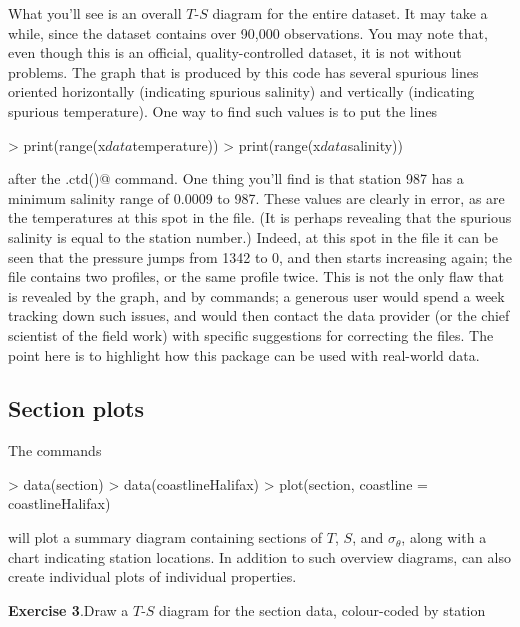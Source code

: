 \documentclass{article}
\newcommand{\workedexercise}[2]{
	\vspace{2ex plus 2ex minus 1ex}
	\begin{boxedminipage}[c]{0.95\linewidth}
		{\textbf{Exercise #1}.\hspace{1em}#2}
	\end{boxedminipage}
	\vspace{2ex plus 2ex minus 1ex}
}
\begin{document}
What you'll see is an overall $T$-$S$ diagram for the entire dataset. It may take
a while, since the dataset contains over 90,000 observations. You may note that,
even though this is an official, quality-controlled dataset, it is not without
problems. The graph that is produced by this code has several spurious lines
oriented horizontally (indicating spurious salinity) and vertically (indicating
spurious temperature). One way to find such values is to put the lines
\begin{Schunk}
\begin{Sinput}
> print(range(x$data$temperature))
> print(range(x$data$salinity))
\end{Sinput}
\end{Schunk}
after the \verb@read.ctd()@ command. One thing you'll find is that station 987
has a minimum salinity range of 0.0009 to 987. These values are clearly in
error, as are the temperatures at this spot in the file. (It is perhaps
revealing that the spurious salinity is equal to the station number.) Indeed, at
this spot in the file it can be seen that the pressure jumps from 1342 to 0, and
then starts increasing again; the file contains two profiles, or the same
profile twice. This is not the only flaw that is revealed by the graph, and by
\verb@range@ commands; a generous user would spend a week tracking down such
issues, and would then contact the data provider (or the chief scientist of the
field work) with specific suggestions for correcting the files. The point here
is to highlight how this package can be used with real-world data.

\subsection{Section plots}
The commands
\begin{Schunk}
\begin{Sinput}
> data(section)
> data(coastlineHalifax)
> plot(section, coastline = coastlineHalifax)
\end{Sinput}
\end{Schunk}
will plot a summary diagram containing sections of
$T$, $S$, and $\sigma_\theta$, along with a chart indicating station
locations. In addition to such overview diagrams, \verb@plot@ can also create
individual plots of individual properties.

\workedexercise{3}{Draw a $T$-$S$ diagram for the section data, colour-coded by station}

\end{document}
